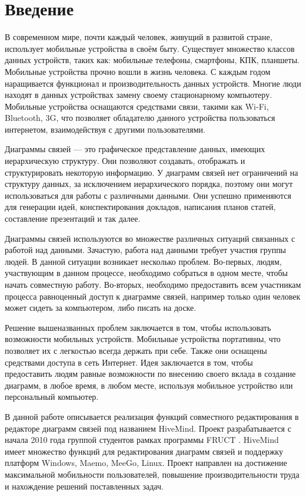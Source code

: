 \newpage

\chapter*{Введение}
\label{chap:introduction}

В современном мире, почти каждый человек, живущий в развитой стране, использует
мобильные устройства в своём быту. Существует множество классов данных
устройств, таких как: мобильные телефоны, смартфоны, КПК, планшеты. Мобильные
устройства прочно вошли в жизнь человека. С каждым годом наращивается функционал
и производительность данных устройств. Многие люди находят в данных устройствах
замену своему стационарному компьютеру. Мобильные устройства оснащаются
средствами связи, такими как Wi-Fi, Bluetooth, 3G, что позволяет обладателю
данного устройства пользоваться интернетом, взаимодействуя с другими
пользователями.

Диаграммы связей --- это графическое представление данных, имеющих иерархическую
структуру. Они позволяют создавать, отображать и структурировать некоторую
информацию. У диаграмм связей нет ограничений на структуру данных, за
исключением иерархического порядка, поэтому они могут использоваться для работы с различными
данными. Они успешно применяются для генерации идей, конспектирования докладов,
написания планов статей, составление презентаций и так далее.

Диаграммы связей используются во множестве различных ситуаций связанных с
работой над данными. Зачастую, работа над данными требует участия группы людей. В данной
ситуации возникает несколько проблем. Во-первых, людям, участвующим в данном
процессе, необходимо собраться в одном месте, чтобы начать совместную работу.
Во-вторых, необходимо предоставить всем участникам процесса равноценный доступ к
диаграмме связей, например только один человек может сидеть за компьютером, либо
писать на доске.

Решение вышеназванных проблем заключается в том, чтобы использовать возможности
мобильных устройств. Мобильные устройства портативны, что позволяет их с
легкостью всегда держать при себе. Также они оснащены средствами доступа в сеть
Интернет. Идея заключается в том, чтобы предоставить людям равные возможности по
внесению своего вклада в создание диаграмм, в любое время, в любом месте,
используя мобильное устройство или персональный компьютер.

В данной работе описывается реализация функций совместного редактирования в
редакторе диаграмм связей под названием HiveMind. Проект разрабатывается с
начала 2010 года группой студентов рамках программы FRUCT
\cite{hivemind-8th-fruct}. HiveMind имеет множество функций для редактирования
диаграмм связей и поддержку платформ Windows, Maemo, MeeGo, Linux. Проект
направлен на достижение максимальной мобильности пользователей, повышение
производительности труда и нахождение решений поставленных задач.
